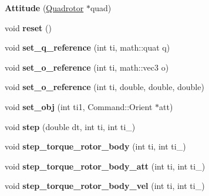 \begin{DoxyCompactItemize}
\item 
\hypertarget{classAttitude_a3d8702ddb8ebe640b4dae5d2a13415c7}{
{\bfseries Attitude} (\hyperlink{classQuadrotor}{Quadrotor} $\ast$quad)}
\label{classAttitude_a3d8702ddb8ebe640b4dae5d2a13415c7}

\item 
\hypertarget{classAttitude_a7e04169ea1c1b522a529c2c175cf73e7}{
void {\bfseries reset} ()}
\label{classAttitude_a7e04169ea1c1b522a529c2c175cf73e7}

\item 
\hypertarget{classAttitude_a8b8e86dce3952d51a2b31bdb19922f20}{
void {\bfseries set\_\-q\_\-reference} (int ti, math::quat q)}
\label{classAttitude_a8b8e86dce3952d51a2b31bdb19922f20}

\item 
\hypertarget{classAttitude_adb83854056302fbda19b037da086f839}{
void {\bfseries set\_\-o\_\-reference} (int ti, math::vec3 o)}
\label{classAttitude_adb83854056302fbda19b037da086f839}

\item 
\hypertarget{classAttitude_a9bc858b7855f4f3ea2b405759c34e6ec}{
void {\bfseries set\_\-o\_\-reference} (int ti, double, double, double)}
\label{classAttitude_a9bc858b7855f4f3ea2b405759c34e6ec}

\item 
\hypertarget{classAttitude_ac718a7f20470355bb45d1c14ef266d95}{
void {\bfseries set\_\-obj} (int ti1, Command::Orient $\ast$att)}
\label{classAttitude_ac718a7f20470355bb45d1c14ef266d95}

\item 
\hypertarget{classAttitude_a9d2850ba4bc838cf06907a351004bf13}{
void {\bfseries step} (double dt, int ti, int ti\_)}
\label{classAttitude_a9d2850ba4bc838cf06907a351004bf13}

\item 
\hypertarget{classAttitude_ad611f128c6a7d4cbb0f52fad22dc7c98}{
void {\bfseries step\_\-torque\_\-rotor\_\-body} (int ti, int ti\_)}
\label{classAttitude_ad611f128c6a7d4cbb0f52fad22dc7c98}

\item 
\hypertarget{classAttitude_a96c6947c3d191036db56a103e1a01f4d}{
void {\bfseries step\_\-torque\_\-rotor\_\-body\_\-att} (int ti, int ti\_)}
\label{classAttitude_a96c6947c3d191036db56a103e1a01f4d}

\item 
\hypertarget{classAttitude_a3acffc90c62c76fe37ce352e090f804f}{
void {\bfseries step\_\-torque\_\-rotor\_\-body\_\-vel} (int ti, int ti\_)}
\label{classAttitude_a3acffc90c62c76fe37ce352e090f804f}


\end{DoxyCompactItemize}
